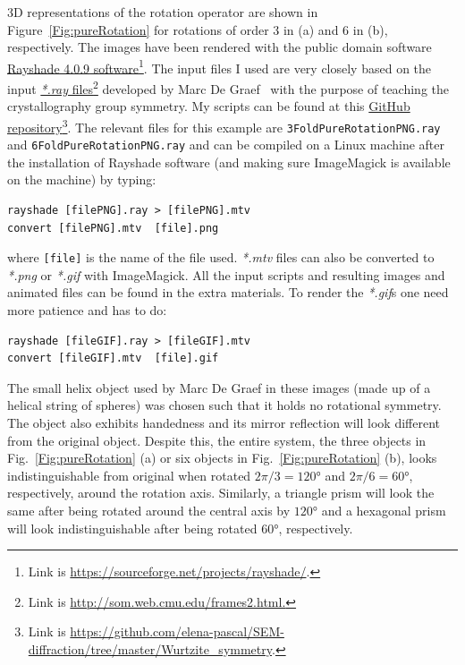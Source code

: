 3D representations of the rotation operator are shown in Figure~\ref{Fig:pureRotation} for rotations of order 3 in (a) and 6 in (b), respectively. The images have been rendered with the public domain software \href{https://sourceforge.net/projects/rayshade/}{\textsf{Rayshade 4.0.9} software}\footnote{ Link is \href{https://sourceforge.net/projects/rayshade/}{https://sourceforge.net/projects/rayshade/}.}. The input files I used are very closely based on the input  \href{http://som.web.cmu.edu/frames2.html}{\emph{*.ray} files}\footnote{ Link is \href{http://som.web.cmu.edu/frames2.html.}{http://som.web.cmu.edu/frames2.html.}} developed by Marc De Graef~\cite{DeGraef98} with the purpose of teaching the crystallography group symmetry\cite{teachingPointGroup}. My scripts can be found at this \href{https://github.com/elena-pascal/SEM-diffraction/tree/master/Wurtzite_symmetry/}{GitHub repository}\footnote{ Link is \href{https://github.com/elena-pascal/SEM-diffraction/tree/master/Wurtzite_symmetry}{https://github.com/elena-pascal/SEM-diffraction/tree/master/Wurtzite\_symmetry}.}. The relevant files for this example are \texttt{3FoldPureRotationPNG.ray} and \texttt{6FoldPureRotationPNG.ray} and can be compiled on a Linux machine after the installation of \textsf{Rayshade} software (and making sure \textsf{ImageMagick} is available on the machine) by typing:
\begin{verbatim}
rayshade [filePNG].ray > [filePNG].mtv
convert [filePNG].mtv  [file].png 
\end{verbatim}
where \texttt{[file]} is the name of the file used. \emph{*.mtv} files can also be converted to \emph{*.png} or \emph{*.gif} with \textsf{ImageMagick}. All the input scripts and resulting images and animated files can be found in the extra materials. To render the \emph{*.gif}s one need more patience and has to do:
\begin{verbatim}
rayshade [fileGIF].ray > [fileGIF].mtv
convert [fileGIF].mtv  [file].gif 
\end{verbatim}

The small helix object used by Marc  De Graef in these images (made up of a helical string of spheres) was chosen such that it holds no rotational symmetry. The object also exhibits handedness and its mirror reflection will look different from the original object.  Despite this, the entire system, the three objects in Fig.~\ref{Fig:pureRotation} (a) or six objects in Fig.~\ref{Fig:pureRotation} (b), looks indistinguishable from original when rotated $2\pi/3 = 120\si{\degree}$ and $2\pi/6 = 60\si{\degree}$, respectively, around the rotation axis. Similarly, a triangle prism will look the same after being rotated around the central axis by $120\si{\degree}$ and a hexagonal prism will look indistinguishable after being rotated $60\si{\degree}$, respectively.

